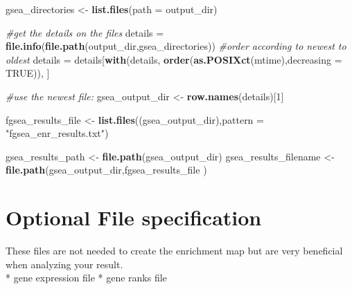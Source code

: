 \documentclass[
]{book}
\newenvironment{Shaded}{\begin{snugshade}}{\end{snugshade}}
\newcommand{\AttributeTok}[1]{\textcolor[rgb]{0.13,0.29,0.53}{#1}}
\newcommand{\CommentTok}[1]{\textcolor[rgb]{0.56,0.35,0.01}{\textit{#1}}}
\newcommand{\ConstantTok}[1]{\textcolor[rgb]{0.56,0.35,0.01}{#1}}
\newcommand{\DecValTok}[1]{\textcolor[rgb]{0.00,0.00,0.81}{#1}}
\newcommand{\FunctionTok}[1]{\textcolor[rgb]{0.13,0.29,0.53}{\textbf{#1}}}
\newcommand{\NormalTok}[1]{#1}
\newcommand{\OtherTok}[1]{\textcolor[rgb]{0.56,0.35,0.01}{#1}}
\newcommand{\StringTok}[1]{\textcolor[rgb]{0.31,0.60,0.02}{#1}}
\begin{document}
\begin{Shaded}
\begin{Highlighting}[]
\NormalTok{gsea\_directories }\OtherTok{\textless{}{-}} \FunctionTok{list.files}\NormalTok{(}\AttributeTok{path =}\NormalTok{ output\_dir)}

\CommentTok{\#get the details on the files}
\NormalTok{details }\OtherTok{=} \FunctionTok{file.info}\NormalTok{(}\FunctionTok{file.path}\NormalTok{(output\_dir,gsea\_directories))}
\CommentTok{\#order according to newest to oldest}
\NormalTok{details }\OtherTok{=}\NormalTok{ details[}\FunctionTok{with}\NormalTok{(details, }\FunctionTok{order}\NormalTok{(}\FunctionTok{as.POSIXct}\NormalTok{(mtime),}\AttributeTok{decreasing =} \ConstantTok{TRUE}\NormalTok{)), ]}

\CommentTok{\#use the newest file:}
\NormalTok{gsea\_output\_dir }\OtherTok{\textless{}{-}} \FunctionTok{row.names}\NormalTok{(details)[}\DecValTok{1}\NormalTok{]}

\NormalTok{fgsea\_results\_file }\OtherTok{\textless{}{-}} \FunctionTok{list.files}\NormalTok{((gsea\_output\_dir),}\AttributeTok{pattern =} \StringTok{"fgsea\_enr\_results.txt"}\NormalTok{)}

\NormalTok{gsea\_results\_path }\OtherTok{\textless{}{-}} \FunctionTok{file.path}\NormalTok{(gsea\_output\_dir)}
\NormalTok{gsea\_results\_filename }\OtherTok{\textless{}{-}} \FunctionTok{file.path}\NormalTok{(gsea\_output\_dir,fgsea\_results\_file )}
\end{Highlighting}
\end{Shaded}

\section{Optional File specification}\label{optional-file-specification-1}

These files are not needed to create the enrichment map but are very beneficial when analyzing your result.\\
* gene expression file
* gene ranks file
\end{document}
